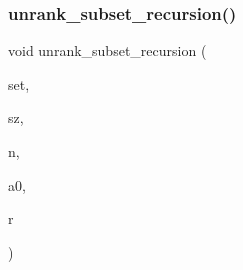 \subsubsection{\texorpdfstring{unrank\+\_\+subset\+\_\+recursion()}{unrank\_subset\_recursion()}}
{\footnotesize\ttfamily void unrank\+\_\+subset\+\_\+recursion (\begin{DoxyParamCaption}\item[{\mbox{\hyperlink{galois_8h_a09fddde158a3a20bd2dcadb609de11dc}{I\+NT}} $\ast$}]{set,  }\item[{\mbox{\hyperlink{galois_8h_a09fddde158a3a20bd2dcadb609de11dc}{I\+NT}} \&}]{sz,  }\item[{\mbox{\hyperlink{galois_8h_a09fddde158a3a20bd2dcadb609de11dc}{I\+NT}}}]{n,  }\item[{\mbox{\hyperlink{galois_8h_a09fddde158a3a20bd2dcadb609de11dc}{I\+NT}}}]{a0,  }\item[{\mbox{\hyperlink{galois_8h_a09fddde158a3a20bd2dcadb609de11dc}{I\+NT}} \&}]{r }\end{DoxyParamCaption})}

